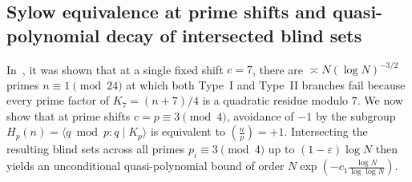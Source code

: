 \documentclass[11pt, a4paper]{article}
\theoremstyle{plain}
\theoremstyle{definition}
\newcommand{\leg}[2]{\left(\frac{#1}{#2}\right)}
\begin{document}
\subsection{Sylow equivalence at prime shifts and quasi-polynomial decay of intersected blind sets}\label{subsec:blind_intersection}

In~\cite[\S4.2]{dahan2026a}, it was shown that at a single fixed shift $c=7$, there are $\asymp N(\log N)^{-3/2}$ primes $n\equiv1\pmod{24}$ at which both Type~I and Type~II branches fail because every prime factor of $K_7=(n+7)/4$ is a quadratic residue modulo $7$. We now show that at prime shifts $c=p\equiv3\pmod 4$, avoidance of $-1$ by the subgroup $H_p(n)=\langle q\bmod p:q\mid K_p\rangle$ is equivalent to $\leg{n}{p}=+1$. Intersecting the resulting blind sets across all primes $p_i\equiv3\pmod 4$ up to $(1-\varepsilon)\log N$ then yields an unconditional quasi-polynomial bound of order $N\exp(-c_1\frac{\log N}{\log\log N})$.
\end{document}
